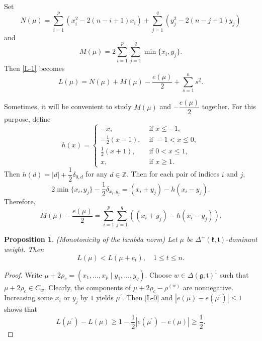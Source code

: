 \documentclass[11pt]{amsart}
\theoremstyle{plain}
\newtheorem{prop}[thm]{Proposition}
\theoremstyle{definition}
\newcommand{\frg}{\mathfrak{g}}
\newcommand{\frk}{\mathfrak{k}}
\newcommand{\frt}{\mathfrak{t}}
\newcommand{\bbZ}{\mathbb{Z}}
\begin{document}
 Set
\begin{equation}\label{N-mu}
 	N(\mu)=\sum_{i=1}^p(x_i^2-2(n-i+1)x_i)+\sum_{j=1}^q(y_j^2-2(n-j+1)y_j)
\end{equation}
and
\begin{equation}\label{M-mu}
M(\mu)=2\sum_{i=1}^p\sum_{j=1}^q\min\{x_i,y_j\}.
\end{equation}
Then \eqref{L-1} becomes
 \begin{equation}\label{L-N-M}
L(\mu)=N(\mu)+M(\mu)-\dfrac{e(\mu)}{2}+\sum_{s=1}^n s^2.
\end{equation}

Sometimes, it will be convenient to study $M(\mu)$ and $-\dfrac{e(\mu)}{2}$ together. For this purpose, define
\begin{equation}\label{function-h}
h(x)=\left\{
 	\begin{array}{ll}
 		-x, & \text{ if } x\le -1, \\
 		-\frac{1}{2}(x-1), & \text{ if } -1<x \leq 0,\\
 		\frac{1}{2}(x+1), &\text{ if } 0<x\leq 1,\\
 		x, &\text{ if } x\ge1.
\end{array}
\right.
\end{equation}
Then $h(d)=|d|+\dfrac{1}{2}\delta_{0, d}$ for any $d\in\bbZ$. Then for each pair of indices $i$ and $j$,
 	\[2\min\{x_i,y_j\}-\dfrac{1}{2}\delta_{x_i, y_j}=(x_i+y_j)-h(x_i-y_j).\]
Therefore,
\begin{equation}\label{M-mu-e-mu}
M(\mu)-\dfrac{e(\mu)}{2}=\sum_{i=1}^{p} \sum_{j=1}^{q} \left( (x_i+y_j)-h(x_i-y_j)\right).
\end{equation}


 \begin{prop} \emph{(Monotonicity of the lambda norm)} \label{lambda-up}
 	Let $\mu$ be $\Delta^+(\frk,\frt)$-dominant weight. Then
 	\[L(\mu)<L(\mu+e_t),\quad 1\le t\le n.\]
 \end{prop}
 \begin{proof}
 	Write $\mu+2\rho_c=(x_1,\dots,x_p\mid y_1,\dots,y_q)$. Choose $w\in\Delta(\frg,\frt)^1$ such that $\mu+2\rho_c\in C_w$. Clearly, the components of $\mu+2\rho_c-\rho^{(w)}$ are nonnegative. Increasing some $x_i$ or $y_j$ by $1$ yields $\mu^\prime$. Then \eqref{L-0} and $|e(\mu)-e(\mu^\prime)|\le 1$ shows that
 \[L(\mu^\prime)-L(\mu)\ge 1-\dfrac{1}{2}|e(\mu^\prime)-e(\mu)|\ge \dfrac{1}{2}.\]
 \end{proof}
\end{document}
